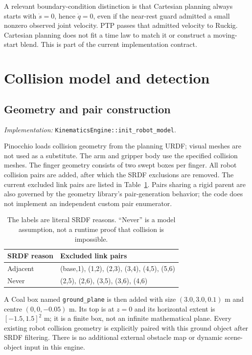 \documentclass[11pt,a4paper]{report}
\newcommand{\file}[1]{\nolinkurl{#1}}
\newcommand{\src}[1]{\textit{Implementation:} \file{#1}.}
\begin{document}
A relevant boundary-condition distinction is that Cartesian planning always
starts with $\dot s=0$, hence $\dot q=0$, even if the near-rest guard admitted
a small nonzero observed joint velocity. PTP passes that admitted velocity
to Ruckig. Cartesian planning does not fit a time law to match it or construct
a moving-start blend. This is part of the current implementation contract.

\section{Collision model and detection}
\subsection{Geometry and pair construction}
\src{KinematicsEngine::init_robot_model}

Pinocchio loads collision geometry from the planning URDF; visual meshes
are not used as a substitute. The arm and gripper body use the specified
collision meshes. The finger geometry consists of two swept boxes per finger.
All robot collision pairs are added, after which the SRDF exclusions are
removed. The current excluded link pairs are listed in Table~\ref{tab:srdf}.
Pairs sharing a rigid parent are also governed by the geometry library's
pair-generation behavior; the code does not implement an independent custom
pair enumerator.

\begin{table}[htbp]
\centering\small
\begin{tabular}{@{}ll@{}}
\toprule
SRDF reason & Excluded link pairs \\
\midrule
Adjacent & (base,1), (1,2), (2,3), (3,4), (4,5), (5,6)\\
Never & (2,5), (2,6), (3,5), (3,6), (4,6)\\
\bottomrule
\end{tabular}
\caption{The labels are literal SRDF reasons. ``Never'' is a model assumption,
not a runtime proof that collision is impossible.}\label{tab:srdf}
\end{table}

A Coal box named \file{ground_plane} is then added with size
$(3.0,3.0,0.1)$ m and centre $(0,0,-0.05)$ m. Its top is at $z=0$ and its
horizontal extent is $[-1.5,1.5]^2$ m; it is a finite box, not an infinite
mathematical plane. Every existing robot collision geometry is explicitly
paired with this ground object after SRDF filtering. There is no additional
external obstacle map or dynamic scene-object input in this engine.
\end{document}
